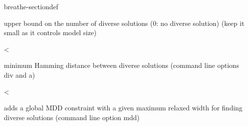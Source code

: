 \documentclass[letterpaper,10pt,openany,oneside,english]{sphinxmanual}
\begin{document}
\begin{fulllineitems}
\begin{sphinxuseclass}{breathe-sectiondef}
\begin{fulllineitems}
\sphinxAtStartPar
upper bound on the number of diverse solutions (0: no diverse solution) (keep it small as it controls model size) 

\end{fulllineitems}


\begin{fulllineitems}
\label{\detokenize{ref/ref_cpp:_CPPv4N8ToulBar28divWidthE}}\label{\detokenize{ref/ref_cpp:_CPPv3N8ToulBar28divWidthE}}\label{\detokenize{ref/ref_cpp:_CPPv2N8ToulBar28divWidthE}}\label{\detokenize{ref/ref_cpp:ToulBar2::divWidth__unsigned-i}}
\pysigstartsignatures
\pysigstartmultiline
{}
\pysigstopmultiline
\pysigstopsignatures
\sphinxAtStartPar
\textless{} 

\sphinxAtStartPar
minimum Hamming distance between diverse solutions (command line options \sphinxhyphen{}div and \sphinxhyphen{}a) 

\end{fulllineitems}


\begin{fulllineitems}
\label{\detokenize{ref/ref_cpp:_CPPv4N8ToulBar29divMethodE}}\label{\detokenize{ref/ref_cpp:_CPPv3N8ToulBar29divMethodE}}\label{\detokenize{ref/ref_cpp:_CPPv2N8ToulBar29divMethodE}}\label{\detokenize{ref/ref_cpp:ToulBar2::divMethod__unsigned-i}}
\pysigstartsignatures
\pysigstartmultiline
{}
\pysigstopmultiline
\pysigstopsignatures
\sphinxAtStartPar
\textless{} 

\sphinxAtStartPar
adds a global MDD constraint with a given maximum relaxed width for finding diverse solutions (command line option \sphinxhyphen{}mdd) 

\end{fulllineitems}


\end{sphinxuseclass}
\end{fulllineitems}
\end{document}

